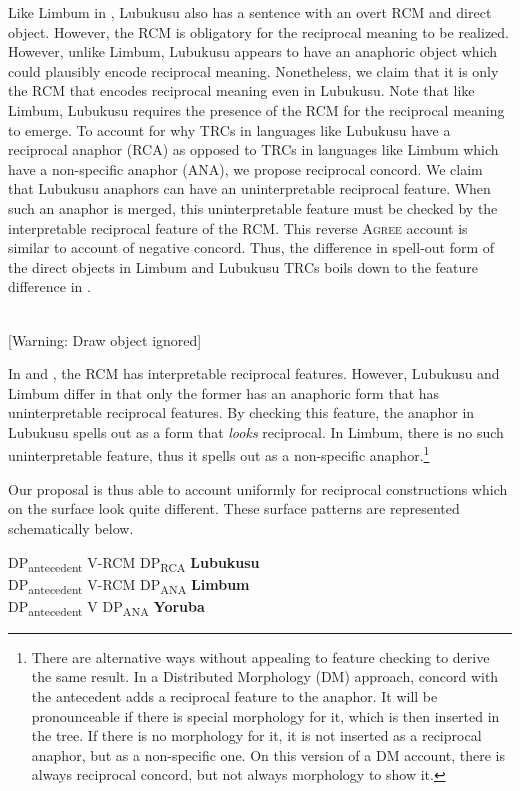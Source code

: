 \documentclass[output=paper]{langsci/langscibook}
\begin{document}
Like Limbum in , Lubukusu also has a sentence with an overt RCM and direct object. However, the RCM is obligatory for the reciprocal meaning to be realized. However, unlike Limbum, Lubukusu appears to have an anaphoric object which could plausibly encode reciprocal meaning. Nonetheless, we claim that it is only the RCM that encodes reciprocal meaning even in Lubukusu. Note that like Limbum, Lubukusu requires the presence of the RCM for the reciprocal meaning to emerge. To account for why TRCs in languages like Lubukusu have a reciprocal anaphor (RCA) as opposed to TRCs in languages like Limbum which have a non-specific anaphor (ANA), we propose reciprocal concord. We claim that Lubukusu anaphors can have an uninterpretable reciprocal feature. When such an anaphor is merged, this uninterpretable feature must be checked by the interpretable reciprocal feature of the RCM. This reverse \textsc{Agree} account is similar to  account of negative concord. Thus, the difference in spell-out form of the direct objects in Limbum and Lubukusu TRCs boils down to the feature difference in .


\ea\label{ex:}
\ea
{}\\{}
[Warning: Draw object ignored]
\ex
{}
\z
\z

In  and , the RCM has interpretable reciprocal features. However, Lubukusu and Limbum differ in that only the former has an anaphoric form that has uninterpretable reciprocal features. By checking this feature, the anaphor in Lubukusu spells out as a form that \textit{looks} reciprocal. In Limbum, there is no such uninterpretable feature, thus it spells out as a non-specific anaphor.\footnote{ There are alternative ways without appealing to feature checking to derive the same result. In a Distributed Morphology (DM) approach, concord with the antecedent adds a reciprocal feature to the anaphor. It will be pronounceable if there is special morphology for it, which is then inserted in the tree. If there is no morphology for it, it is not inserted as a reciprocal anaphor, but as a non-specific one. On this version of a DM account, there is always reciprocal concord, but not always morphology to show it.} 

  Our proposal is thus able to account uniformly for reciprocal constructions which on the surface look quite different. These surface patterns are represented schematically below.


\ea\label{ex:}
\glll DP\-\textsubscript{antecedent}      V-RCM  DP\textsubscript{RCA}    \textbf{Lubukusu}\\
DP\-\textsubscript{antecedent}      V-RCM  DP\textsubscript{ANA}    \textbf{Limbum}\\
DP\-\textsubscript{antecedent}      V    DP\textsubscript{ANA}    \textbf{Yoruba}   \\
\z
\end{document}

